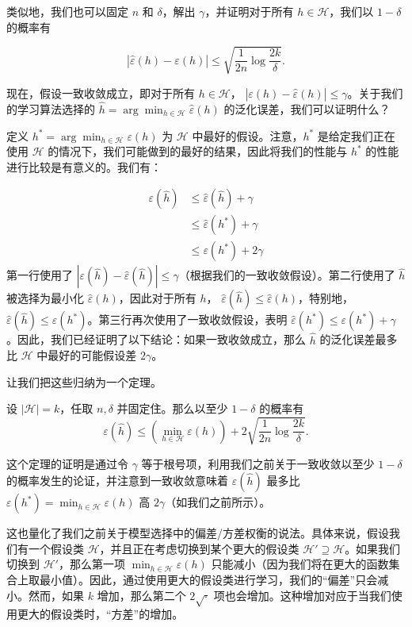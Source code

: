 类似地，我们也可以固定 $n$ 和 $\delta$，解出 $\gamma$，并证明对于所有 $h \in \mathcal{H}$，我们以 $1 - \delta$ 的概率有

\[
    |\hat{\varepsilon}(h) - \varepsilon(h)| \leq \sqrt{\frac{1}{2n} \log \frac{2k}{\delta}}.
\]

现在，假设一致收敛成立，即对于所有 $h \in \mathcal{H}$， $|\varepsilon(h) - \hat{\varepsilon}(h)| \leq \gamma$。关于我们的学习算法选择的 $\hat{h} = \arg \min_{h \in \mathcal{H}} \hat{\varepsilon}(h)$ 的泛化误差，我们可以证明什么？

定义 $h^* = \arg \min_{h \in \mathcal{H}} \varepsilon(h)$ 为 $\mathcal{H}$ 中最好的假设。注意，$h^*$ 是给定我们正在使用 $\mathcal{H}$ 的情况下，我们可能做到的最好的结果，因此将我们的性能与 $h^*$ 的性能进行比较是有意义的。我们有：

\begin{align*}
    \varepsilon(\hat{h}) 
    &\leq \hat{\varepsilon}(\hat{h}) + \gamma \\
    &\leq \hat{\varepsilon}(h^*) + \gamma \\
    &\leq \varepsilon(h^*) + 2\gamma
\end{align*}
第一行使用了 $|\varepsilon(\hat{h}) - \hat{\varepsilon}(\hat{h})| \leq \gamma$（根据我们的一致收敛假设）。第二行使用了 $\hat{h}$ 被选择为最小化 $\hat{\varepsilon}(h)$，因此对于所有 $h$， $\hat{\varepsilon}(\hat{h}) \leq \hat{\varepsilon}(h)$，特别地， $\hat{\varepsilon}(\hat{h}) \leq \hat{\varepsilon}(h^*)$。第三行再次使用了一致收敛假设，表明 $\hat{\varepsilon}(h^*) \leq \varepsilon(h^*) + \gamma$。因此，我们已经证明了以下结论：如果一致收敛成立，那么 $\hat{h}$ 的泛化误差最多比 $\mathcal{H}$ 中最好的可能假设差 $2\gamma$。

让我们把这些归纳为一个定理。

\begin{theorem*}
    设 $|\mathcal{H}| = k$，任取 $n, \delta$ 并固定住。那么以至少 $1 - \delta$ 的概率有
    \[
        \varepsilon(\hat{h}) \leq \left(\min_{h \in \mathcal{H}} \varepsilon(h)\right) + 2\sqrt{\frac{1}{2n} \log \frac{2k}{\delta}}.
    \]
\end{theorem*}

这个定理的证明是通过令 $\gamma$ 等于根号项，利用我们之前关于一致收敛以至少 $1 - \delta$ 的概率发生的论证，并注意到一致收敛意味着 $\varepsilon(\hat{h})$ 最多比 $\varepsilon(h^*) = \min_{h \in \mathcal{H}} \varepsilon(h)$ 高 $2\gamma$（如我们之前所示）。

这也量化了我们之前关于模型选择中的偏差/方差权衡的说法。具体来说，假设我们有一个假设类 $\mathcal{H}$，并且正在考虑切换到某个更大的假设类 $\mathcal{H}' \supseteq \mathcal{H}$。如果我们切换到 $\mathcal{H}'$，那么第一项 $\min_{h \in \mathcal{H}} \varepsilon(h)$ 只能减小（因为我们将在更大的函数集合上取最小值）。因此，通过使用更大的假设类进行学习，我们的“偏差”只会减小。然而，如果 $k$ 增加，那么第二个 $2\sqrt{\cdot}$ 项也会增加。这种增加对应于当我们使用更大的假设类时，“方差”的增加。

